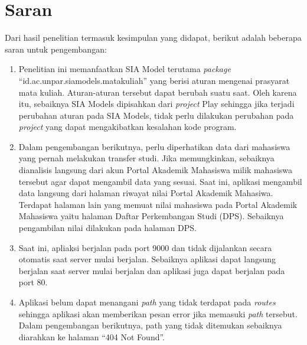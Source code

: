 \section{Saran}
\label{sec:saran}
Dari hasil penelitian termasuk kesimpulan yang didapat, berikut adalah beberapa saran untuk pengembangan:
	\begin{enumerate}
		\item Penelitian ini memanfaatkan SIA Model terutama \textit{package} ``id.ac.unpar.siamodels.matakuliah'' yang berisi aturan mengenai prasyarat mata kuliah. Aturan-aturan tersebut dapat berubah suatu saat. Oleh karena itu, sebaiknya SIA Models dipisahkan dari \textit{project} Play sehingga jika terjadi perubahan aturan pada SIA Models, tidak perlu dilakukan perubahan pada \textit{project} yang dapat mengakibatkan kesalahan kode program. 
		\item Dalam pengembangan berikutnya, perlu diperhatikan data dari mahasiswa yang pernah melakukan transfer studi. Jika memungkinkan, sebaiknya dianalisis langsung dari akun Portal Akademik Mahasiswa milik mahasiswa tersebut agar dapat mengambil data yang sesuai. Saat ini, aplikasi mengambil data langsung dari halaman riwayat nilai Portal Akademik Mahasiwa. Terdapat halaman lain yang memuat nilai mahasiswa pada Portal Akademik Mahasiswa yaitu halaman Daftar Perkembangan Studi (DPS). Sebaiknya pengambilan nilai dilakukan pada halaman DPS.
		\item Saat ini, apliaksi berjalan pada port 9000 dan tidak dijalankan secara otomatis saat server mulai berjalan. Sebaiknya aplikasi dapat langsung berjalan saat server mulai berjalan dan aplikasi juga dapat berjalan pada port 80.
		\item Aplikasi belum dapat menangani \textit{path} yang tidak terdapat pada \textit{routes} sehingga aplikasi akan memberikan pesan error jika memasuki \textit{path} tersebut. Dalam pengembangan berikutnya, path yang tidak ditemukan sebaiknya diarahkan ke halaman ``404 Not Found''.
	\end{enumerate}